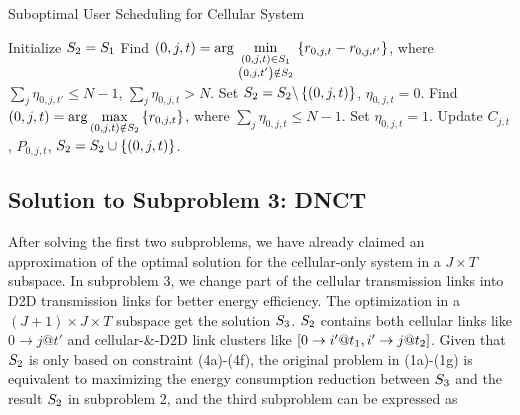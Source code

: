 \documentclass{ieeeaccess}
\begin{document}
\begin{algorithm}[h]
\caption{Suboptimal User Scheduling for Cellular System}
\label{alg:1}
\begin{algorithmic}[1]
\STATE Initialize ${{\bf{S}}_{\bf{2}}}={{\bf{S}}_{\bf{1}}}$
  \STATE Find $\left( {0,j,t} \right) = \arg \mathop {\min }\limits_{\scriptstyle \left( {0,j,t} \right) \in {{\bf{S}}_{\bf{1}}} \atop
  \scriptstyle \left( {0,j,t'} \right) \notin {{\bf{S}}_{\bf{2}}}}  \left\{ {{r_{0,j,t}} - {r_{0,j,t'}}} \right\}$, where $\sum\limits_{j} {{\eta _{0,j,t'}}}  \le N - 1$, $\sum\limits_j {{\eta _{0,j,t}} > N} $.
  \STATE Set ${{\bf{S}}_{\bf{2}}}={{\bf{S}}_{\bf{2}}}\backslash \left\{ {\left( {0,j,t} \right)} \right\}$, ${\eta _{0,j,t}} = 0$.
    \STATE Find ${\left( {0,j,t} \right) = \arg \mathop {\max }\limits_{\left( {0,j,t} \right) \notin {{\bf{S}}_{\bf{2}}}} \left\{ {{r_{0,j,t}}} \right\}}$, where ${\sum\limits_j {{\eta _{0,j,t}}}  \le N - 1}$.
    \STATE Set ${\eta _{0,j,t}} = 1$.
    \STATE Update ${C_{j,t}}$, ${P_{0,j,t}}$, ${{\bf{S}}_{\bf{2}}}={{\bf{S}}_{\bf{2}}} \cup \left\{ {\left( {0,j,t} \right)} \right\}$.
  \ENDWHILE
\ENDWHILE
\end{algorithmic}
\end{algorithm}

\subsection{Solution to \textbf{Subproblem 3: DNCT}}

After solving the first two subproblems, we have already claimed an approximation of the optimal solution for the cellular-only system in a $J \times T$ subspace. In subproblem 3, we change part of the cellular transmission links into D2D transmission links for better energy efficiency. The optimization in a $\left( {J + 1} \right) \times J \times T$ subspace get the solution ${{\bf{S}}_{\bf{3}}}$. ${{\bf{S}}_{\bf{2}}}$ contains both cellular links like $0 \to j@t'$ and cellular-\&-D2D link clusters like $\left[ {{\rm{0}} \to i'@{t_1},i' \to j@{t_2}} \right]$.
Given that ${{\bf{S}}_{\bf{2}}}$ is only based on constraint (4a)-(4f), the original problem in (1a)-(1g) is equivalent to maximizing the energy consumption reduction between ${{\bf{S}}_{\bf{3}}}$ and the result ${{\bf{S}}_{\bf{2}}}$ in subproblem 2, and the third subproblem can be expressed as
\end{document}
